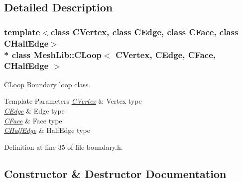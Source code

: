 \subsection{Detailed Description}
\subsubsection*{template$<$class C\+Vertex, class C\+Edge, class C\+Face, class C\+Half\+Edge$>$\\*
class Mesh\+Lib\+::\+C\+Loop$<$ C\+Vertex, C\+Edge, C\+Face, C\+Half\+Edge $>$}

\hyperlink{class_mesh_lib_1_1_c_loop}{C\+Loop} Boundary loop class. 


\begin{DoxyTemplParams}{Template Parameters}
{\em \hyperlink{class_mesh_lib_1_1_c_vertex}{C\+Vertex}} & Vertex type \\
\hline
{\em \hyperlink{class_mesh_lib_1_1_c_edge}{C\+Edge}} & Edge type \\
\hline
{\em \hyperlink{class_mesh_lib_1_1_c_face}{C\+Face}} & Face type \\
\hline
{\em \hyperlink{class_mesh_lib_1_1_c_half_edge}{C\+Half\+Edge}} & Half\+Edge type \\
\hline
\end{DoxyTemplParams}


Definition at line 35 of file boundary.\+h.



\subsection{Constructor \& Destructor Documentation}
